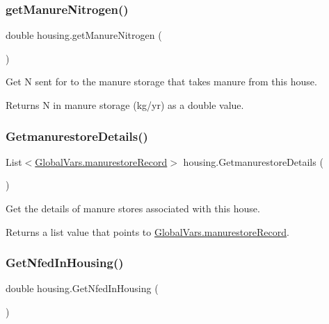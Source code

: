 \subsubsection{\texorpdfstring{getManureNitrogen()}{getManureNitrogen()}}
{\footnotesize\ttfamily double housing.\+get\+Manure\+Nitrogen (\begin{DoxyParamCaption}{ }\end{DoxyParamCaption})\hspace{0.3cm}{\ttfamily [inline]}}



Get N sent for to the manure storage that takes manure from this house. 

\begin{DoxyReturn}{Returns}
N in manure storage (kg/yr) as a double value. 
\end{DoxyReturn}
\mbox{\label{classhousing_a470209947b645d13f08b36e81b376c83}} 
\subsubsection{\texorpdfstring{GetmanurestoreDetails()}{GetmanurestoreDetails()}}
{\footnotesize\ttfamily List$<$\mbox{\hyperlink{struct_global_vars_1_1manurestore_record}{Global\+Vars.\+manurestore\+Record}}$>$ housing.\+Getmanurestore\+Details (\begin{DoxyParamCaption}{ }\end{DoxyParamCaption})\hspace{0.3cm}{\ttfamily [inline]}}



Get the details of manure stores associated with this house. 

\begin{DoxyReturn}{Returns}
a list value that points to \mbox{\hyperlink{struct_global_vars_1_1manurestore_record}{Global\+Vars.\+manurestore\+Record}}. 
\end{DoxyReturn}
\mbox{\label{classhousing_a5b879d4a3c6633d648bf5194fb9c6c49}} 
\subsubsection{\texorpdfstring{GetNfedInHousing()}{GetNfedInHousing()}}
{\footnotesize\ttfamily double housing.\+Get\+Nfed\+In\+Housing (\begin{DoxyParamCaption}{ }\end{DoxyParamCaption})\hspace{0.3cm}{\ttfamily [inline]}}



